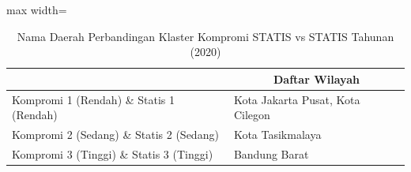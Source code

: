 \begin{table}[H]
\centering
\caption{Nama Daerah Perbandingan Klaster Kompromi STATIS vs STATIS Tahunan (2020)} \label{tab:sample1comp_statis_name_2020}
\begin{adjustbox}{max width=\textwidth}
\begin{tabular}{|>{\centering\arraybackslash}p{4cm}|p{10cm}|}
\hline
\multicolumn{1}{|c|}{\textbf{Kategori}} & \multicolumn{1}{c|}{\textbf{Daftar Wilayah}} \\
\hline
Kompromi 1 (Rendah) \& Statis 1 (Rendah) & Kota Jakarta Pusat, Kota Cilegon \\
\hline
Kompromi 2 (Sedang) \& Statis 2 (Sedang) & Kota Tasikmalaya \\
\hline
Kompromi 3 (Tinggi) \& Statis 3 (Tinggi) & Bandung Barat \\
\hline
\end{tabular}
\end{adjustbox}
\end{table}